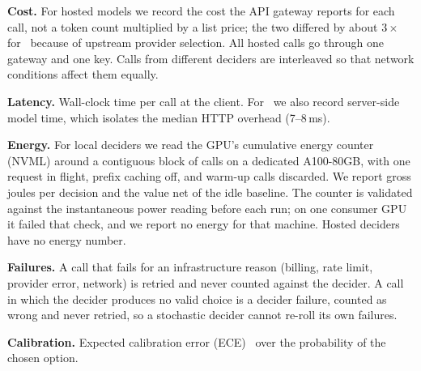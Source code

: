 \textbf{Cost.} For hosted models we record the cost the API gateway reports for each call, not a token count multiplied by a list price; the two differed by about $3\times$ for \goss\ because of upstream provider selection.
All hosted calls go through one gateway and one key.
Calls from different deciders are interleaved so that network conditions affect them equally.

\textbf{Latency.} Wall-clock time per call at the client.
For \kev\ we also record server-side model time, which isolates the median HTTP overhead (7--8\,ms).

\textbf{Energy.} For local deciders we read the GPU's cumulative energy counter (NVML) around a contiguous block of calls on a dedicated A100-80GB, with one request in flight, prefix caching off, and warm-up calls discarded.
We report gross joules per decision and the value net of the idle baseline.
The counter is validated against the instantaneous power reading before each run; on one consumer GPU it failed that check, and we report no energy for that machine.
Hosted deciders have no energy number.

\textbf{Failures.} A call that fails for an infrastructure reason (billing, rate limit, provider error, network) is retried and never counted against the decider.
A call in which the decider produces no valid choice is a decider failure, counted as wrong and never retried, so a stochastic decider cannot re-roll its own failures.

\textbf{Calibration.} Expected calibration error (ECE)~\cite{guo2017calibration} over the probability of the chosen option.

